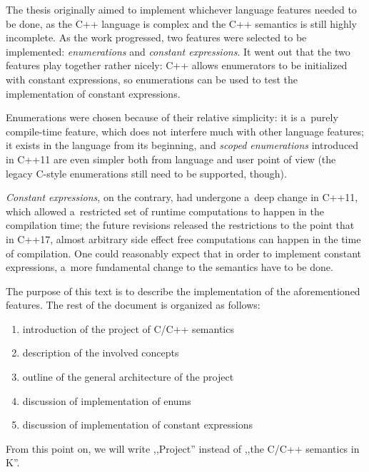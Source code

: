 \documentclass{fithesis3}
\newcommand{\Project}{Project\xspace}
\begin{document}
The thesis originally aimed to implement whichever language features needed to be done, as the C++ language is complex and the C++ semantics is still highly incomplete. As the work progressed, two features were selected to be implemented: \textit{enumerations} and \textit{constant expressions}. It went out that the two features play together rather nicely: C++ allows enumerators to be initialized with constant expressions, so enumerations can be used to test the implementation of constant expressions. 

Enumerations were chosen because of their relative simplicity: it is a~purely compile-time feature, which does not interfere much with other language features; it exists in the language from its beginning, and \textit{scoped enumerations} introduced in C++11 are even simpler both from language and user point of view (the legacy C-style enumerations still need to be supported, though).

\textit{Constant expressions}, on the contrary, had undergone a~deep change in C++11, which allowed a~restricted set of runtime computations to happen in the compilation time; the future revisions released the restrictions to the point that in C++17, almost arbitrary side effect free computations can happen in the time of compilation. One could reasonably expect that in order to implement constant expressions, a~more fundamental change to the semantics have to be done.
 

The purpose of this text is to describe the implementation of the aforementioned features. The rest of the document is organized as follows:
\begin{enumerate}
\item introduction of the project of C/C++ semantics
\item description of the involved concepts
\item outline of the general architecture of the project
\item discussion of implementation of enums
\item discussion of implementation of constant expressions
\end{enumerate}

From this point on, we will write ,,\Project'' instead of ,,the C/C++ semantics in K''.

\end{document}
